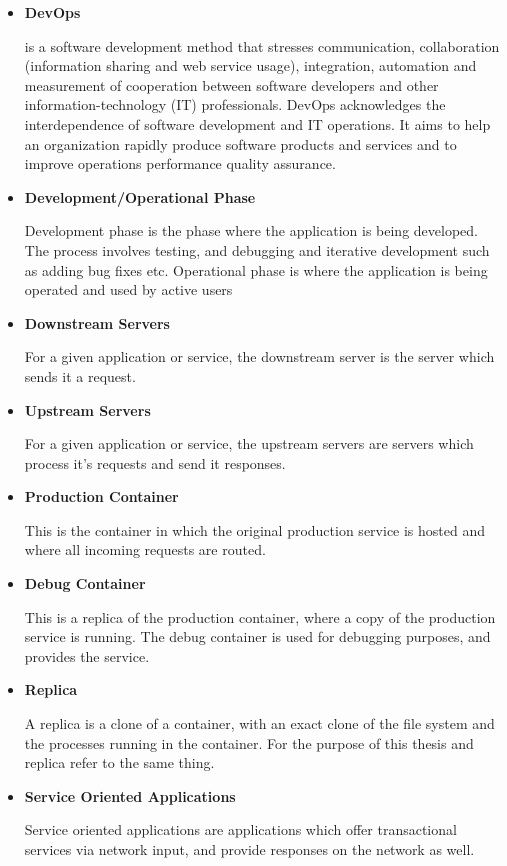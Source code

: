 \begin{itemize}
	\item \hypertarget{defn:devops}{\textbf{DevOps}} is a software development method that stresses communication, collaboration (information sharing and web service usage), integration, automation and measurement of cooperation between software developers and other information-technology (IT) professionals.
	DevOps acknowledges the interdependence of software development and IT operations.
	It aims to help an organization rapidly produce software products and services and to improve operations performance quality assurance.
	
	
	\item \hypertarget{defn:development-phase}{\textbf{Development/Operational Phase}} Development phase is the phase where the application is being developed.
	The process involves testing, and debugging and iterative development such as adding bug fixes etc. Operational phase is where the application is being operated and used by active users
	
	\item \hypertarget{defn:downstream-servers}{\textbf{Downstream Servers}} 
	For a given application or service, the downstream server is the server which sends it a request.
	
	\item \hypertarget{defn:upstream-servers}{\textbf{Upstream Servers}}
	For a given application or service, the upstream servers are servers which process it's requests and send it responses.
	
	
	\item \hypertarget{defn:production container}{\textbf{Production Container}}
	This is the container in which the original production service is hosted and where all incoming requests are routed.
	
	\item \hypertarget{defn:debug container}{\textbf{Debug Container}}
	This is a replica of the production container, where a copy of the production service is running. The debug container is used for debugging purposes, and provides the \livedebugging service.
	
	\item \hypertarget{defn:replica}{\textbf{Replica}}
	A replica is a clone of a container, with an exact clone of the file system and the processes running in the container. For the purpose of this thesis \debugcontainer and replica refer to the same thing.
	
	\item \hypertarget{defn:SOA}{\textbf{Service Oriented Applications}}
	Service oriented applications are applications which offer transactional services via network input, and provide responses on the network as well.
	
\end{itemize}

